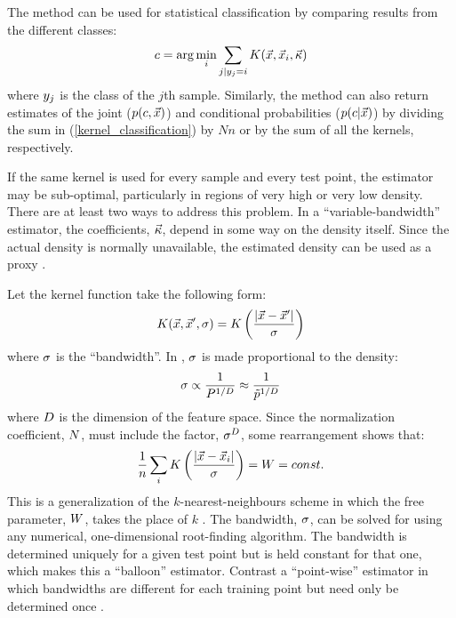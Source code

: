 The method can be used for statistical classification by comparing
results from the different classes:
\begin{equation}
	c = \arg \min_i \sum_{j|y_j = i} K(\vec {x}, \vec {x}_i, \vec \kappa)
	\label{kernel_classification}
\end{equation}
where $y_j$ is the class of the $j$th sample.
Similarly, the method can also return estimates of
the joint ($p(c, \vec x)$) and conditional probabilities 
($p(c |\vec x)$)
by dividing the sum in (\ref{kernel_classification})
by $Nn$ or by the sum of all the kernels, respectively. 

If the same kernel is used for every sample and every test point, the estimator
may be sub-optimal, particularly in regions of very high or very low density.
There are at least two ways to address this problem.
In a ``variable-bandwidth'' estimator, the coefficients, $\vec \kappa$, depend in some
way on the density itself. 
Since the actual density is normally unavailable, the
estimated density can be used as a proxy
\citep{Terrell_Scott1992, Mills2011}.

Let the kernel function take the following form:
\begin{equation}
	K(\vec {x}, \vec {x}^\prime, \sigma) = K \left (\frac{|\vec {x} - \vec {x}^\prime|}{\sigma} \right )
	\label{scalar_kernel_def}
\end{equation}
where $\sigma$ is the ``bandwidth''. 
In \citet{Mills2011}, $\sigma$ is made proportional to the density:
\begin{equation}
	\sigma \propto \frac{1}{P^{1/D}} \approx \frac{1}{\tilde p^{1/D}}
	\label{setting_the_bandwidth}
\end{equation}
where $D$ is the dimension of the feature space.
Since the normalization coefficient, $N$, must include the factor,
${\sigma^D}$, some rearrangement shows that:
\begin{equation}
	\frac{1}{n} \sum_i K \left (\frac{|\vec {x} - \vec {x}_i|}{\sigma} \right ) = W = const.
	\label{agf_def}
\end{equation}
This is a generalization of the $k$-nearest-neighbours scheme in which the
free parameter, $W$, takes the place of $k$ \citep{Mills2009, Mills2011}.
The bandwidth, $\sigma$, can be solved
for using any numerical, one-dimensional root-finding algorithm.
The bandwidth is determined uniquely for a given test point but is held constant for that
one, which makes this a ``balloon'' estimator. 
Contrast a ``point-wise'' estimator
in which bandwidths are different for each training point but need only be determined once
\citep{Terrell_Scott1992}.


